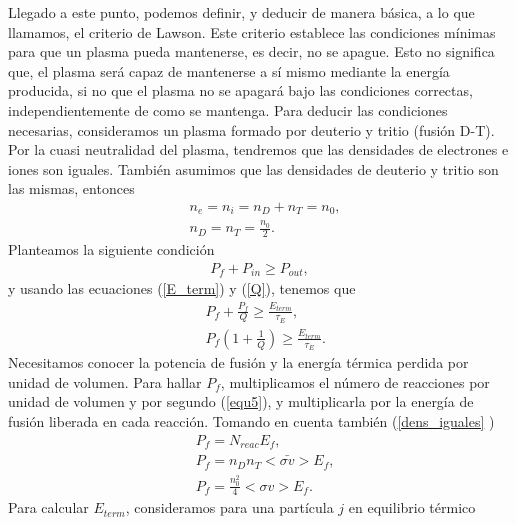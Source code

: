 \documentclass[../main.tex]{subfiles}
\begin{document}
        Llegado a este punto, podemos definir, y deducir de manera básica, a lo que llamamos, el criterio de Lawson. Este criterio establece las condiciones mínimas para que un plasma pueda mantenerse, es decir, no se apague.
        Esto no significa que, el plasma será capaz de mantenerse a sí mismo mediante la energía producida, si no que el plasma no se apagará
        bajo las condiciones correctas, independientemente de como se mantenga.
        Para deducir las condiciones necesarias, consideramos un plasma formado por deuterio y tritio (fusión D-T). Por la cuasi neutralidad
        del plasma, tendremos que las densidades de electrones e iones son iguales. También asumimos que las densidades de deuterio y tritio son
        las mismas, entonces
        \begin{align}
            &n_e = n_i = n_D + n_T = n_0, \label{dens_fusion} \\
            &n_D = n_T = \frac{n_0}{2}. \label{dens_iguales}
        \end{align}
    Planteamos la siguiente condición
        \begin{align}
            P_f + P_{in} \geq P_{out},
        \end{align}
    y usando las ecuaciones (\ref{E_term}) y (\ref{Q}), tenemos que
        \begin{align}
            &P_f + \frac{P_f}{Q} \geq \frac{E_{term}}{\tau_E}, \\
            &P_f \left(1+ \frac{1}{Q} \right) \geq \frac{E_{term}}{\tau_E}. \label{final_condicion}
        \end{align}
        Necesitamos conocer la potencia de fusión y la energía térmica perdida por unidad de volumen. Para hallar $P_f$, multiplicamos el número de reacciones por unidad de volumen y por segundo (\ref{equ5}), y multiplicarla por la energía de fusión liberada en cada reacción. Tomando en cuenta también (\ref{dens_iguales}
)
        \begin{align}
            &P_f = N_{reac}E_f, \\
            &P_f = n_Dn_T\bar{<\sigma v>}E_f, \\
          &P_f=\frac{n_0^2}{4}<\sigma v>E_f. \label{final_pf}
        \end{align}
        Para calcular $E_{term}$, consideramos para una partícula $j$ en equilibrio térmico
\end{document}
